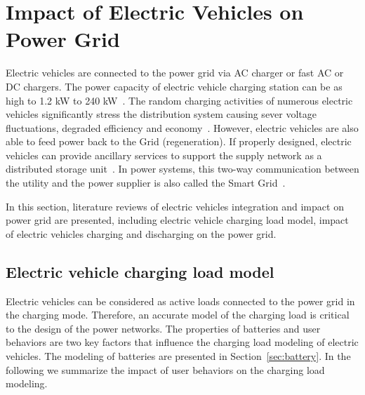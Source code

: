 \section{Impact of Electric Vehicles on Power Grid} \label{sec:power_grid}

Electric vehicles are connected to the power grid via AC charger or fast AC or DC chargers. 
The power capacity of electric vehicle charging station can be as high to 1.2 kW to 240 kW~\cite{YC_Hadley}.
The random charging activities of numerous electric vehicles significantly stress the distribution system causing sever voltage fluctuations, degraded efficiency and economy~\cite{YC_Putrus, YC_Clement}. 
However, electric vehicles are also able to feed power back to the Grid (regeneration). 
If properly designed, electric vehicles can provide ancillary services to support the supply network as a distributed storage unit~\cite{YC_smartgrid1,YC_smartgrid2}. 
In power systems, this two-way communication between the utility and the power supplier is also called the Smart Grid~\cite{YC_smartgrid}.

In this section, literature reviews of electric vehicles integration and impact on power grid are presented, including electric vehicle charging load model, impact of electric vehicles charging and discharging on the power grid.

\subsection{Electric vehicle charging load model}

Electric vehicles can be considered as active loads connected to the power grid in the charging mode. 
Therefore, an accurate model of the charging load is critical to the design of the power networks. 
The properties of batteries and user behaviors are two key factors that influence the charging load modeling of electric vehicles. The modeling of batteries are presented in Section~\ref{sec:battery}. 
In the following we summarize the impact of user behaviors on the charging load modeling. 

